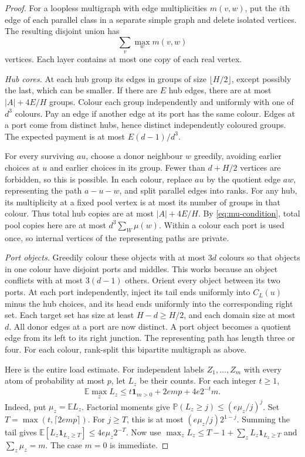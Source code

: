 \documentclass[11pt]{article}
\theoremstyle{remark}\newtheorem*{remark}{Remark}
\newcommand{\E}{\mathbb E}
\newcommand{\Prob}{\mathbb P}
\begin{document}
\begin{proof}
For a loopless multigraph with edge multiplicities $m(v,w)$, put the
$i$th edge of each parallel class in a separate simple graph and delete
isolated vertices. The resulting disjoint union has
\begin{equation}\label{eq:ranks}
 \sum_v\max_w m(v,w)
\end{equation}
vertices. Each layer contains at most one copy of each real vertex.

\emph{Hub cores.}
At each hub group its edges in groups of size $\lfloor H/2\rfloor$,
except possibly the last, which can be smaller.
If there are $E$ hub edges, there are at most $|A|+4E/H$ groups.
Colour each group independently and uniformly with one of $d^3$ colours.
Pay an edge if another edge at its port has the same colour.
Edges at a port come from distinct hubs, hence distinct independently
coloured groups. The expected payment is at most $E(d-1)/d^3$.

For every surviving $au$, choose a donor neighbour $w$ greedily, avoiding
earlier choices at $u$ and earlier choices in its group.
Fewer than $d+H/2$ vertices are forbidden, so this is possible.
In each colour, replace $au$ by the quotient edge $aw$, representing
the path $a-u-w$, and split parallel edges into ranks.
For any hub, its multiplicity at a fixed pool vertex is at most its
number of groups in that colour. Thus total hub copies are at most
$|A|+4E/H$. By \eqref{eq:mu-condition}, total pool copies here are at
most $d^3\sum_W\mu(w)$.
Within a colour each port is used once, so internal vertices of the
representing paths are private.

\emph{Port objects.}
Greedily colour these objects with at most $3d$ colours so that objects
in one colour have disjoint ports and middles. This works because an
object conflicts with at most $3(d-1)$ others.
Orient every object between its two ports. At each port independently,
inject its tail ends uniformly into $C_L(u)$ minus the hub choices,
and its head ends uniformly into the corresponding right set.
Each target set has size at least $H-d\ge H/2$, and each domain size
at most $d$. All donor edges at a port are now distinct.
A port object becomes a quotient edge from its left to its right
junction. The representing path has length three or four.
For each colour, rank-split this bipartite multigraph as above.

Here is the entire load estimate. For independent labels
$Z_1,\ldots,Z_m$ with every atom of probability at most $p$, let $L_z$
be their counts. For each integer $t\ge1$,
\begin{equation}\label{eq:occupancy}
 \E\max_zL_z\le t\mathbf1_{m>0}+2emp+4e2^{-t}m.
\end{equation}
Indeed, put $\mu_z=\E L_z$. Factorial moments give
$\Prob(L_z\ge j)\le(e\mu_z/j)^j$. Set $T=\max(t,\lceil2emp\rceil)$.
For $j\ge T$, this is at most
$(e\mu_z/j)2^{1-j}$. Summing the tail gives
$\E[L_z\mathbf1_{L_z\ge T}]\le4e\mu_z2^{-T}$.
Now use $\max_zL_z\le T-1+\sum_z L_z\mathbf1_{L_z\ge T}$ and
$\sum_z\mu_z=m$. The case $m=0$ is immediate.


\end{proof}
\end{document}
